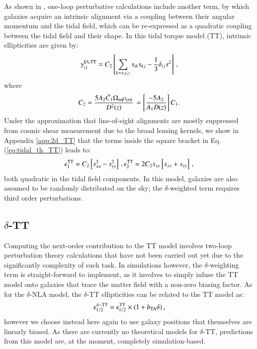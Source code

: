 \documentclass[useAMS,usenatbib]{mn2e}
\begin{document}
As shown in \citet{Blazek2019}, one-loop perturbative calculations include another term, by which galaxies acquire an intrinsic alignment via a coupling between their angular momentum and the tidal field, which can be re-expressed as a quadratic coupling between the tidal field and their shape. In this tidal torque model (TT), intrinsic ellipticities are given by:
\begin{eqnarray}
\gamma_{ij}^{\rm IA, TT} = C_2 \left[ \sum_{k=x,y,z} s_{ik} s_{kj} -\frac{1}{3} \delta_{ij} s^2 \right] \, ,
\label{eq:tidal_th_TT}
\end{eqnarray}
where 
\begin{eqnarray}
C_2 = \frac{5 A_2 \bar{C_1} \Omega_{\rm m} \rho_{\rm crit}}{D^2(z)} \,  = \left[ \frac{-5 A_2}{A_1 D(z)} \right] C_1.
\end{eqnarray}
Under the approximation that line-of-sight alignments are mostly suppressed from cosmic shear measurement due to the broad lensing kernels, 
we show in  Appendix \ref{app:2d_TT} that the terms inside the square bracket in Eq. (\ref{eq:tidal_th_TT}) leads to:
\begin{eqnarray}
\epsilon_1^{\rm TT} = C_2  \left[ s_{xx}^2 - s_{yy}^2\right] \, , \epsilon_2^{\rm TT} = 2 C_2 s_{xy}\left[s_{xx}+s_{yy}  \right]\, ,
\end{eqnarray}
both quadratic in the tidal field components. In this model, galaxies are also assumed to be randomly distributed on the sky; the $\delta$-weighted term requires third order perturbations.


\subsection{$\delta$-TT}
\label{subsec:IA_th_TT}

Computing the next-order contribution to the TT model involves two-loop perturbation theory calculations that have not been carried out  yet due to the significantly complexity of such task. In simulations however, the $\delta$-weighting term is straight-forward to implement, as it involves to simply infuse the TT model onto galaxies that trace the matter field with a non-zero biasing factor. As for the $\delta$-NLA model, the $\delta$-TT ellipticities can  be related to the TT model as:
\begin{eqnarray}
\epsilon_{1/2}^{\delta-\rm TT} = \epsilon_{1/2}^{\rm TT}\times(1 + b_{\rm TA}\delta) \, ,
\label{eq:tidal_th_deltaTT}
\end{eqnarray}
however we choose instead here again to use galaxy positions that themselves are linearly biased.
As there are currently no theoretical models for $\delta$-TT, predictions from this model are, at the moment, completely simulation-based. 
 
\end{document}

